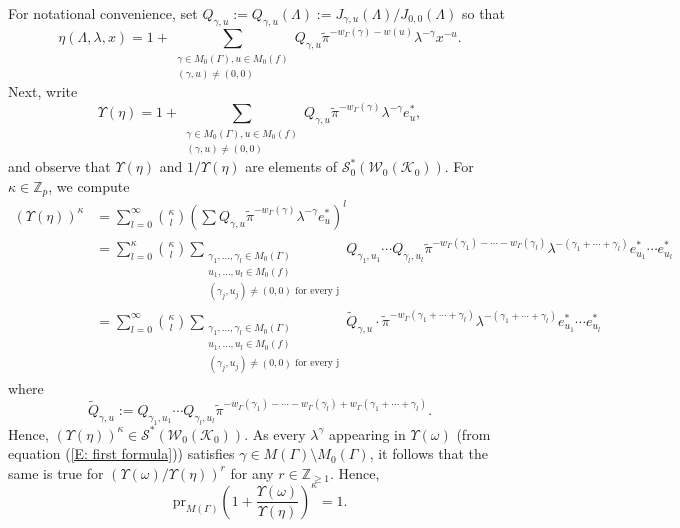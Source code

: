 \documentclass{article}
\theoremstyle{remark}
\def\bb #1{ {\mathbb #1} }
\def\c #1{ {\mathcal #1} }
\begin{document}
For notational convenience, set $Q_{\gamma, u} := Q_{\gamma, u}(\Lambda) := J_{\gamma, u}(\Lambda) / J_{0,0}(\Lambda)$ so that
\[
\eta(\Lambda, \lambda, x) = 1 + \sum_{\substack{\gamma \in M_0(\Gamma), u \in M_0(f) \\ (\gamma, u) \not= (0, 0)}} Q_{\gamma, u} \tilde \pi^{-w_\Gamma(\gamma) - w(u)} \lambda^{-\gamma}  x^{-u}.
\]
Next, write
\[
\Upsilon(\eta) = 1 + \sum_{\substack{\gamma \in M_0(\Gamma), u \in M_0(f) \\ (\gamma, u) \not= (0, 0)}} Q_{\gamma, u} \tilde \pi^{-w_\Gamma(\gamma)} \lambda^{-\gamma} e_u^*,
\]
and observe that $\Upsilon(\eta)$ and $1 / \Upsilon(\eta)$ are elements of $\c S_0^*(\c W_0(\c K_0))$. For $\kappa \in \bb Z_p$, we compute
\begin{align*}
(\Upsilon(\eta))^\kappa &= \sum_{l=0}^\infty \binom{\kappa}{l}(\sum Q_{\gamma, u} \tilde \pi^{-w_\Gamma(\gamma)} \lambda^{-\gamma} e_u^*)^l \\
&= \sum_{l=0}^\kappa \binom{\kappa}{l} \sum_{\substack{\gamma_1, \ldots, \gamma_l \in M_0(\Gamma) \\ u_1, \ldots, u_l \in M_0(f) \\ (\gamma_j, u_j) \not= (0, 0) \text{ for every j}} } Q_{\gamma_1, u_1} \cdots Q_{\gamma_l, u_l} \tilde \pi^{-w_\Gamma(\gamma_1) - \cdots - w_\Gamma(\gamma_l)} \lambda^{-(\gamma_1 + \cdots + \gamma_l)} e_{u_1}^* \cdots e_{u_l}^* \\
&= \sum_{l = 0}^\infty \binom{\kappa}{l} \sum_{\substack{\gamma_1, \ldots, \gamma_l \in M_0(\Gamma) \\ u_1, \ldots, u_l \in M_0(f) \\ (\gamma_j, u_j) \not= (0, 0) \text{ for every j}} } \widetilde{Q}_{\gamma, u} \cdot \tilde \pi^{-w_\Gamma(\gamma_1 + \cdots + \gamma_l)} \lambda^{-(\gamma_1 + \cdots + \gamma_l)} e_{u_1}^* \cdots e_{u_l}^*
\end{align*}
where
\[
\widetilde{Q}_{\gamma, u} := Q_{\gamma_1, u_1} \cdots Q_{\gamma_l, u_l} \tilde \pi^{-w_\Gamma(\gamma_1) - \cdots - w_\Gamma(\gamma_l) + w_\Gamma(\gamma_1 + \cdots + \gamma_l)}.
\]
Hence, $(\Upsilon(\eta))^\kappa \in \c S^*(\c W_0(\c K_0))$.  As every $\lambda^\gamma$ appearing in $\Upsilon(\omega)$ (from equation (\ref{E: first formula})) satisfies $\gamma \in M(\Gamma) \setminus M_0(\Gamma)$, it follows that the same is true for $( \Upsilon(\omega) / \Upsilon(\eta) )^r$ for any $r \in \bb Z_{\geq 1}$. Hence,
\[
\text{pr}_{M(\Gamma)} \left(1 + \frac{\Upsilon(\omega)}{\Upsilon(\eta) } \right)^\kappa  = 1.
\]
\end{document}
